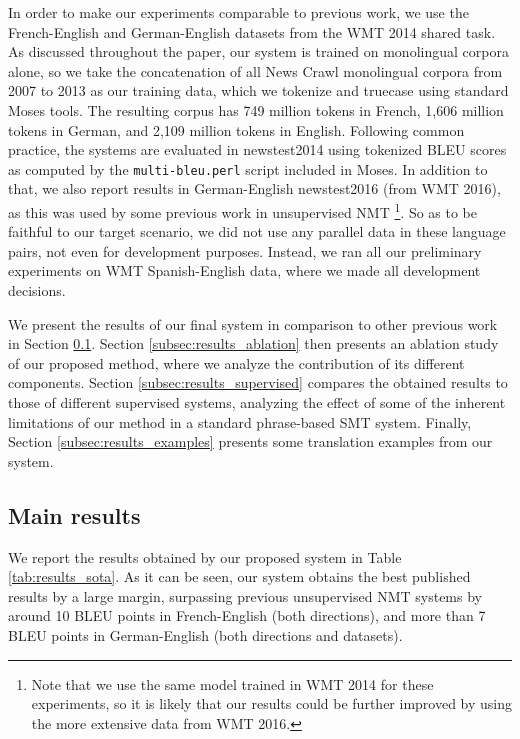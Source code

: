 \documentclass[11pt,a4paper]{article}
\begin{document}
In order to make our experiments comparable to previous work, we use the French-English and German-English datasets from the WMT 2014 shared task. As discussed throughout the paper, our system is trained on monolingual corpora alone, so we take the concatenation of all News Crawl monolingual corpora from 2007 to 2013 as our training data, which we tokenize and truecase using standard Moses tools. The resulting corpus has 749 million tokens in French, 1,606 million tokens in German, and 2,109 million tokens in English. Following common practice, the systems are evaluated in newstest2014 using tokenized BLEU scores as computed by the \texttt{multi-bleu.perl} script included in Moses. In addition to that, we also report results in German-English newstest2016 (from WMT 2016), as this was used by some previous work in unsupervised NMT \citep{lample2018unsupervised,yang2018unsupervised}\footnote{Note that we use the same model trained in WMT 2014 for these experiments, so it is likely that our results could be further improved by using the more extensive data from WMT 2016.}. So as to be faithful to our target scenario, we did not use any parallel data in these language pairs, not even for development purposes. Instead, we ran all our preliminary experiments on WMT Spanish-English data, where we made all development decisions.

We present the results of our final system in comparison to other previous work in Section \ref{subsec:results_main}. Section \ref{subsec:results_ablation} then presents an ablation study of our proposed method, where we analyze the contribution of its different components. Section \ref{subsec:results_supervised} compares the obtained results to those of different supervised systems, analyzing the effect of some of the inherent limitations of our method in a standard phrase-based SMT system. Finally, Section \ref{subsec:results_examples} presents some translation examples from our system.

\subsection{Main results} \label{subsec:results_main}

We report the results obtained by our proposed system in Table \ref{tab:results_sota}. As it can be seen, our system obtains the best published results by a large margin, surpassing previous unsupervised NMT systems by around 10 BLEU points in French-English (both directions), and more than 7 BLEU points in German-English (both directions and datasets).
\end{document}
